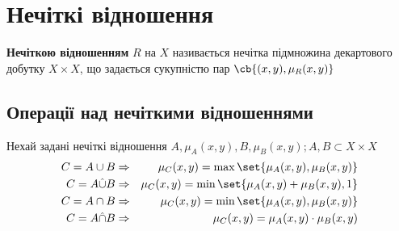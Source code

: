 \section{Нечіткі відношення}
\textbf{Нечіткою відношенням} $R$ на $X$ називається нечітка підмножина декартового добутку $X\times X$, що задається сукупністю пар $\cb{(x,y),\mu_R(x,y)}$\\
\subsection{Операції над нечіткими відношеннями}
Нехай задані нечіткі відношення $A,\mu_A(x,y),B,\mu_B(x,y);A,B\subset X\times X$\\
\begin{eqnarray}
C=A\cup B&\Rightarrow& \mu_C(x,y) = \max\set{\mu_A(x,y),\mu_B(x,y)}\\
C=A\hat\cup B&\Rightarrow& \mu_C(x,y) = \min\set{\mu_A(x,y)+\mu_B(x,y),1}\\
C=A\cap B&\Rightarrow& \mu_C(x,y) = \min\set{\mu_A(x,y),\mu_B(x,y)}\\
C=A\hat\cap B&\Rightarrow& \mu_C(x,y) = \mu_A(x,y)\cdot\mu_B(x,y)
\end{eqnarray}
